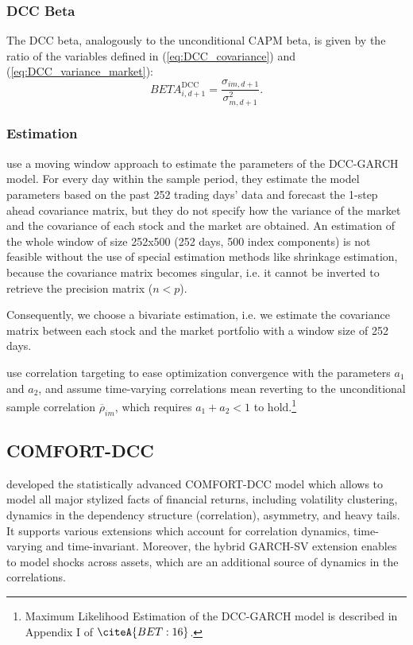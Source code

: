 \documentclass[11pt,a4paper]{article}
\begin{document}
\subsubsection{DCC Beta}

The DCC beta, analogously to the unconditional CAPM beta, is given by the ratio of the variables defined in (\ref{eq:DCC_covariance}) and (\ref{eq:DCC_variance_market}):
\begin{equation}
    BETA_{i,d+1}^{\textrm{DCC}} = \dfrac{\sigma_{im,d+1}}{\sigma_{m,d+1}^2}.
\end{equation}



\subsubsection{Estimation}

 use a moving window approach to estimate the parameters of the DCC-GARCH model. For every day within the sample period, they estimate the model parameters based on the past 252 trading days' data and forecast the 1-step ahead covariance matrix, but they do not specify how the variance of the market and the covariance of each stock and the market are obtained. An estimation of the whole window of size 252x500 (252 days, 500 index components) is not feasible without the use of special estimation methods like shrinkage estimation, because the covariance matrix becomes singular, i.e. it cannot be inverted to retrieve the precision matrix ($n < p$).

Consequently, we choose a bivariate estimation, i.e. we estimate the covariance matrix between each stock and the market portfolio with a window size of 252 days.

 use correlation targeting to ease optimization convergence with the parameters $a_1$ and $a_2$, and assume time-varying correlations mean reverting to the unconditional sample correlation $\overline{\rho}_{im}$, which requires $a_1 + a_2 < 1$ to hold.\footnote{Maximum Likelihood Estimation of the DCC-GARCH model is described in Appendix I of $\citeA{BET:16}$.}



\subsection{COMFORT-DCC}

 developed the statistically advanced COMFORT-DCC model which allows to model all major stylized facts of financial returns, including volatility clustering, dynamics in the dependency structure (correlation), asymmetry, and heavy tails. It supports various extensions which account for correlation dynamics, time-varying and time-invariant. Moreover, the hybrid GARCH-SV extension enables to model shocks across assets, which are an additional source of dynamics in the correlations.
\end{document}

